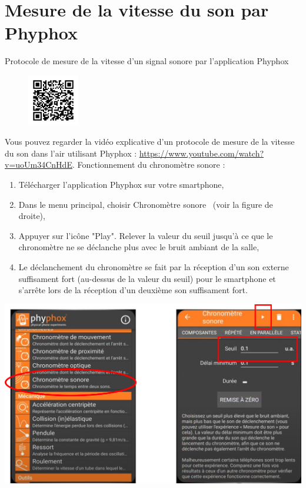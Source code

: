 \newpage

\section{Mesure de la vitesse du son par Phyphox}

\begin{doc}{Protocole de mesure de la vitesse d'un signal sonore par l'application Phyphox}
\begin{figure}
\vspace{-2cm}
    \centering
     \includegraphics[width=0.2\textwidth]{Images/qrcode_phyphox.png}
\end{figure}
Vous pouvez regarder la vidéo explicative d'un protocole de mesure de la vitesse du son dans l'air utilisant Phyphox : \url{https://www.youtube.com/watch?v=uoUm34CnHdE}.\newline
Fonctionnement du chronomètre sonore :
\begin{enumerate}
    \item Télécharger l'application Phyphox sur votre smartphone,
    \item Dans le menu principal, choisir \og Chronomètre sonore \fg ~(voir la figure de droite),
    \item Appuyer sur l'icône "Play". Relever la valeur du seuil jusqu'à ce que le chronomètre ne se déclanche plus avec le bruit ambiant de la salle,
    \item Le déclanchement du chronomètre se fait par la réception d'un son externe suffisament fort (au-dessus de la valeur du seuil) pour le smartphone et s'arrête lors de la réception d'un deuxième son suffisament fort.
\end{enumerate}

\begin{center}
    \includegraphics[scale=0.7]{Images/Phyphox_1.png}
  \end{center}
\end{doc}
\newpage

